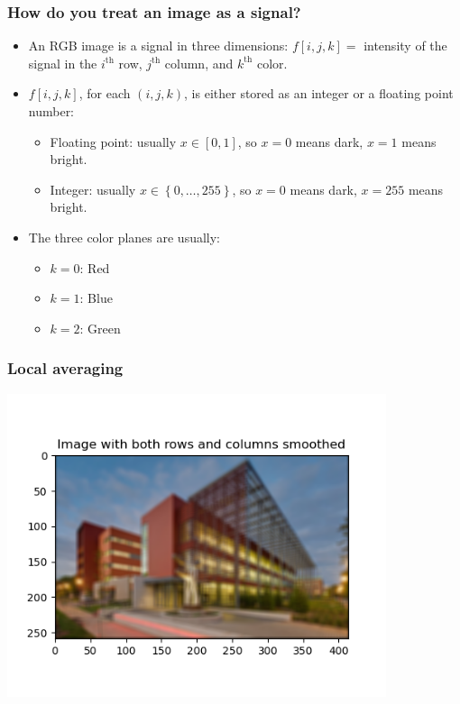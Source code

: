 \documentclass{beamer}
\begin{document}
\begin{frame}
  \frametitle{How do you treat an image as a signal?}
  \begin{itemize}
  \item
    An RGB image is a signal in three dimensions: $f[i,j,k]=$
    intensity of the signal in the $i^{\textrm{th}}$ row,
    $j^{\textrm{th}}$ column, and $k^{\textrm{th}}$ color.
  \item
    $f[i,j,k]$, for each $(i,j,k)$, is either stored as an integer or
    a floating point number:
    \begin{itemize}
    \item Floating point: usually $x\in[0,1]$, so $x=0$ means dark,
      $x=1$ means bright.
    \item Integer: usually $x\in\left\{0,\ldots,255\right\}$, so
      $x=0$ means dark, $x=255$ means bright.
    \end{itemize}
  \item The three color planes are usually:
    \begin{itemize}
    \item $k=0$: Red
    \item $k=1$: Blue
    \item $k=2$: Green
    \end{itemize}
  \end{itemize}
\end{frame}
    
\begin{frame}
  \frametitle{Local averaging}
  \centerline{\includegraphics[height=3.5in]{mp3fig4.png}}
\end{frame}
\end{document}
